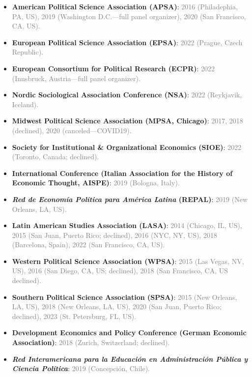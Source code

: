 \begin{itemize}
\item[\textcolor{gray}{\textbullet}] {\bf American Political Science Association (APSA)}: \textcolor{gray}{2016 (Philadephia, PA, US), 2019 (Washington D.C.---full panel organizer), 2020 (San Francisco, CA, US).}
\item[\textcolor{gray}{\textbullet}] {\bf European Political Science Association (EPSA)}: \textcolor{gray}{2022 (Prague, Czech Republic).}
\item[\textcolor{gray}{\textbullet}] {\bf European Consortium for Political Research (ECPR)}: \textcolor{gray}{2022 (Innsbruck, Austria---full panel organizer).}
\item[\textcolor{gray}{\textbullet}] {\bf Nordic Sociological Association Conference (NSA)}: \textcolor{gray}{2022 (Reykjavik, Iceland).}
\item[\textcolor{gray}{\textbullet}] {\bf Midwest Political Science Association (MPSA, Chicago)}: \textcolor{gray}{2017, 2018 (declined), 2020 (canceled---COVID19).}
\item[\textcolor{gray}{\textbullet}] {\bf Society for Institutional \& Organizational Economics (SIOE)}: \textcolor{gray}{2022 (Toronto, Canada; declined).}
\item[\textcolor{gray}{\textbullet}] {\bf International Conference (Italian Association for the History of Economic Thought, AISPE)}: \textcolor{gray}{2019 (Bologna, Italy).}
\item[\textcolor{gray}{\textbullet}] {\bf \emph{Red de Econom\'ia Pol\'itica para Am\'erica Latina} (REPAL)}: \textcolor{gray}{2019 (New Orleans, LA, US).}
\item[\textcolor{gray}{\textbullet}] {\bf Latin American Studies Association (LASA)}: \textcolor{gray}{2014 (Chicago, IL, US), 2015 (San Juan, Puerto Rico; declined), 2016 (NYC, NY, US), 2018 (Barcelona, Spain), 2022 (San Francisco, CA, US).}
\item[\textcolor{gray}{\textbullet}] {\bf Western Political Science Association (WPSA)}: \textcolor{gray}{2015 (Las Vegas, NV, US), 2016 (San Diego, CA, US; declined), 2018 (San Francisco, CA, US declined).}
\item[\textcolor{gray}{\textbullet}] {\bf Southern Political Science Association (SPSA)}: \textcolor{gray}{2015 (New Orleans, LA, US), 2018 (New Orleans, LA, US), 2020 (San Juan, Puerto Rico; declined), 2023 (St. Petersburg, FL, US).}
\item[\textcolor{gray}{\textbullet}] {\bf Development Economics and Policy Conference (German Economic Association)}: \textcolor{gray}{2018 (Zurich, Switzerland; declined).}
\item[\textcolor{gray}{\textbullet}] {\bf \emph{Red Interamericana para la Educaci\'on en Administraci\'on P\'ublica y Ciencia Pol\'itica}}: \textcolor{gray}{2019 (Concepci\'on, Chile).}
\end{itemize}
